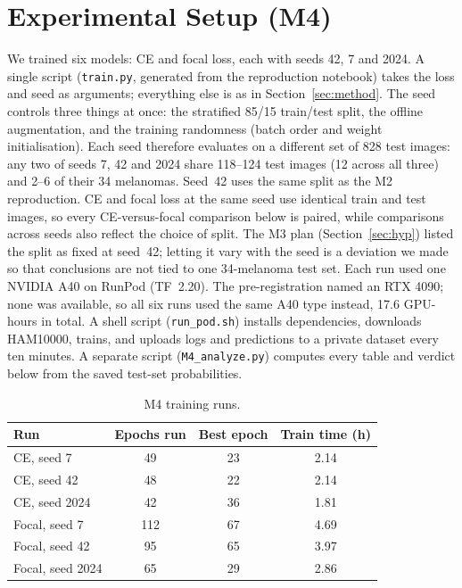 \documentclass[conference]{IEEEtran}
\begin{document}
\section{Experimental Setup (M4)}\label{sec:m4setup}
We trained six models: CE and focal loss, each with seeds 42, 7 and 2024. A single script (\texttt{train.py}, generated from the reproduction notebook) takes the loss and seed as arguments; everything else is as in Section~\ref{sec:method}. The seed controls three things at once: the stratified 85/15 train/test split, the offline augmentation, and the training randomness (batch order and weight initialisation). Each seed therefore evaluates on a different set of 828 test images: any two of seeds 7, 42 and 2024 share 118--124 test images (12 across all three) and 2--6 of their 34 melanomas. Seed~42 uses the same split as the M2 reproduction. CE and focal loss at the same seed use identical train and test images, so every CE-versus-focal comparison below is paired, while comparisons across seeds also reflect the choice of split. The M3 plan (Section~\ref{sec:hyp}) listed the split as fixed at seed~42; letting it vary with the seed is a deviation we made so that conclusions are not tied to one 34-melanoma test set. Each run used one NVIDIA A40 on RunPod (TF~2.20). The pre-registration named an RTX 4090; none was available, so all six runs used the same A40 type instead, 17.6 GPU-hours in total. A shell script (\texttt{run\_pod.sh}) installs dependencies, downloads HAM10000, trains, and uploads logs and predictions to a private dataset every ten minutes. A separate script (\texttt{M4\_analyze.py}) computes every table and verdict below from the saved test-set probabilities.

\begin{table}[t]
\caption{M4 training runs.}
\label{tab:m4runs}
\centering
\footnotesize
\begin{tabular}{lccc}
\toprule
Run & Epochs run & Best epoch & Train time (h)\\
\midrule
CE, seed 7 & 49 & 23 & 2.14\\
CE, seed 42 & 48 & 22 & 2.14\\
CE, seed 2024 & 42 & 36 & 1.81\\
Focal, seed 7 & 112 & 67 & 4.69\\
Focal, seed 42 & 95 & 65 & 3.97\\
Focal, seed 2024 & 65 & 29 & 2.86\\
\bottomrule
\end{tabular}
\end{table}
\end{document}
